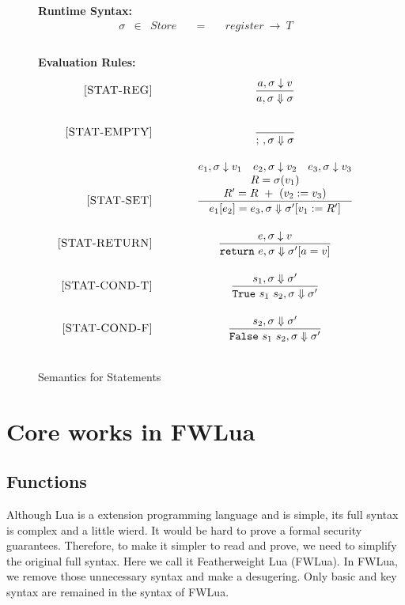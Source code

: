 \documentclass{article}
\begin{document}
\newcommand{\semanticStat}[3]{{#1},{#2} \Downarrow {#3}}
\newcommand{\semanticStatRaw}[3]{{#1},{#2} \Downarrow {#3}}

\begin{figure}[H]
\caption{Semantics for Statements}
{\bf Runtime Syntax:}
\label{fig:StatSem}
\[
\begin{array}{rclcl}
  \sigma & \in & {Store} \quad  & = & \quad {register} ~\rightarrow ~{T} \\
  \\
\end{array}
\]

{\bf Evaluation Rules:~~~ \fbox{$\semanticStatRaw{e}{\sigma}{\sigma'}$}} \\
\[
\begin{array}{r@{\qquad\qquad}c}
\ssrule{STAT-REG}{
  \semanticExp{a}{\sigma}{v}
}{
  \semanticStat{a}{\sigma}{\sigma}
}
\ssrule{STAT-EMPTY}{
}{
  \semanticStat{;~}{\sigma}{\sigma}
}
\ssrule{STAT-SET}{
  \semanticExp{e_1}{\sigma}{v_1} \quad
  \semanticExp{e_2}{\sigma}{v_2} \quad
  \semanticExp{e_3}{\sigma}{v_3} \\
  R = \sigma(v_1)\\
  R' = R~+~(v_2 := v_3)
}{
  \semanticStat{e_1[e_2] = e_3}{\sigma}{\sigma'[v_1 := R']}
}
\ssrule{STAT-RETURN}{
  \semanticExp{e}{\sigma}{v} \\ 
}{
  \semanticStat{{\tt return}~e}{\sigma}{\sigma'[a = v]}
}
\ssrule{STAT-COND-T}{
  \semanticStat{s_1}{\sigma}{\sigma'} \\
}{
  \semanticStat{{\tt True} ~s_1 ~s_2}{\sigma}{\sigma'}
}
\ssrule{STAT-COND-F}{
  \semanticStat{s_2}{\sigma}{\sigma'} \\
}{
  \semanticStat{{\tt False} ~s_1 ~s_2}{\sigma}{\sigma'}
}
\end{array}
\]
\end{figure}


\section{Core works in FWLua}
\subsection{Functions}
Although Lua is a extension programming language and is simple, its full syntax is complex and a little wierd. It would be hard to prove a formal security guarantees. Therefore, to make it simpler to read and prove, we need to simplify the original full syntax. Here we call it Featherweight Lua (FWLua). In FWLua, we remove those unnecessary syntax and make a desugering. Only basic and key syntax are remained in the syntax of FWLua.  
\end{document}
